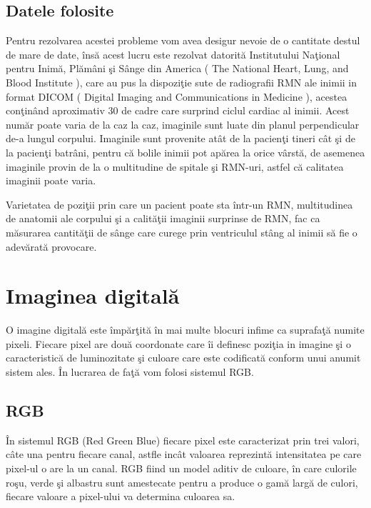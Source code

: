 \subsection{Datele folosite}

Pentru rezolvarea acestei probleme vom avea desigur nevoie de o cantitate destul de mare de date, \^{i}ns\u{a} acest lucru este rezolvat datorit\u{a} Institutului Na\c{t}ional pentru Inim\u{a}, Pl\u{a}m\^{a}ni \c{s}i S\^{a}nge din America ( The National Heart, Lung, and Blood Institute ), care au pus la dispozi\c{t}ie sute de radiografii RMN ale inimii in format DICOM ( Digital Imaging and Communications in Medicine ), acestea con\c{t}in\^{a}nd aproximativ 30 de cadre care surprind ciclul cardiac al inimii. Acest num\u{a}r poate varia de la caz la caz, imaginile sunt luate din planul perpendicular de-a lungul corpului. Imaginile sunt provenite at\^{a}t de la pacien\c{t}i tineri c\^{a}t \c{s}i de la pacien\c{t}i batr\^{a}ni, pentru c\u{a} bolile inimii pot ap\u{a}rea la orice v\^{a}rst\u{a}, de asemenea imaginile provin de la o multitudine de spitale \c{s}i RMN-uri, astfel c\u{a} calitatea imaginii poate varia.

\par

Varietatea de pozi\c{t}ii prin care un pacient poate sta \^{i}ntr-un RMN, multitudinea de anatomii ale corpului \c{s}i a calit\u{a}\c{t}ii imaginii surprinse de RMN, fac ca m\u{a}surarea cantit\u{a}\c{t}ii de s\^{a}nge care curege prin ventriculul st\^{a}ng al inimii s\u{a} fie o adev\u{a}rat\u{a} provocare.

\section{Imaginea digital\u{a}}

O imagine digital\u{a} este \^{i}mp\u{a}r\c{t}it\u{a} \^{i}n mai multe blocuri infime ca suprafa\c{t}\u{a} numite pixeli. Fiecare pixel are dou\u{a} coordonate care \^{i}i definesc pozi\c{t}ia in imagine \c{s}i o caracteristic\u{a} de luminozitate \c{s}i culoare care este codificat\u{a} conform unui anumit sistem ales. \^{I}n lucrarea de fa\c{t}\u{a} vom folosi sistemul RGB.

\subsection{RGB}

\^{I}n sistemul RGB (Red Green Blue) fiecare pixel este caracterizat prin trei valori, c\^{a}te una pentru fiecare canal, astfle inc\^{a}t valoarea reprezint\u{a} intensitatea pe care pixel-ul o are la un canal. RGB fiind un model aditiv de culoare, \^{i}n care culorile ro\c{s}u, verde \c{s}i albastru sunt amestecate pentru a produce o gam\u{a} larg\u{a} de culori, fiecare valoare a pixel-ului va determina culoarea sa.

